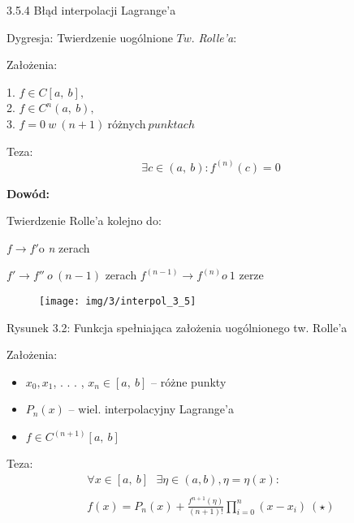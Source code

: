 \begin{frame}{3.5.4 Błąd interpolacji Lagrange'a}

\begin{block}
{Dygresja: Twierdzenie uogólnione $Tw$. {\it Rolle'a}:}

Założenia:
\begin{center}
1. $f\in C[a,\ b],$ \\
2. $f\in C^{n}(a,\ b),$  \\
3. $f=0\: w\: (n+1)\: $różnych$ \:punktach$
\end{center}


Teza:
$$
\exists c\in(a,\ b):f^{(n)}(c)=0
$$
\end{block}
\textbf{Dowód:}

Twierdzenie Rolle'a kolejno do:

$f \rightarrow f'\mathrm{o}$ {\it n} zerach

$f' \rightarrow f'' \:o\:(n-1)$ zerach \newline
$f^{(n-1)} \rightarrow f^{(n)} o\: 1$ zerze
 \end{frame}

 \begin{frame}
 \begin{figure}[h]
			\texttt{[image: img/3/interpol\_3\_5]}
	\end{figure}
Rysunek 3.2: Funkcja spełniająca założenia uogólnionego tw. Rolle'a 
 \end{frame}



 \begin{frame}

Założenia:

\begin{itemize}
\item $x_{0}, x_{1}$, . . . , $x_{n}\in[a,\ b]$ -- różne punkty
\item $P_{n}(x)$ -- wiel. interpolacyjny Lagrange'a
\item $f\in C^{(n+1)}[a,\ b]$
\end{itemize}

\begin{block}
{Teza:}
\begin{gather*}
  \forall x \in[a,\ b] \text{ } \exists \eta \in (a, b), \eta = \eta(x): \\ \\
  f(x)=P_{n}(x)+\frac{f^{n+1}(\eta)}{(n+1)!}\prod_{i=0}^{n}(x-x_{i})\ (\star)
\end{gather*}
\end{block}

\end{frame}

